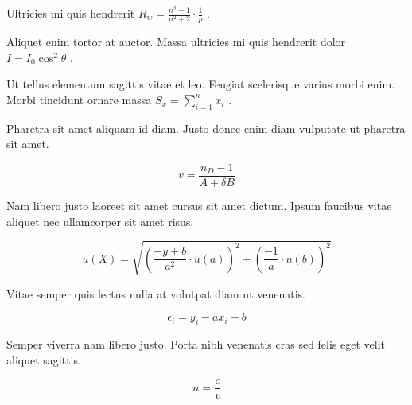 \documentclass{article}
\begin{document}
Ultricies mi quis hendrerit 
\begin{math}
	R_w=\frac{n^2-1}{n^2+2} \cdot \frac{1}{p}
\end{math}
.\newline

Aliquet enim tortor at auctor. Massa ultricies mi quis hendrerit dolor 
$ I=I_0\cos ^2\theta $
.\newline

Ut tellus elementum sagittis vitae et leo. Feugiat scelerisque varius morbi enim. Morbi tincidunt ornare massa
 \( S_x=\sum_{i=1}^{n}x_i \)
 .\newline

Pharetra sit amet aliquam id diam. Justo donec enim diam vulputate ut pharetra sit amet.

\[ v=\frac{n_D-1}{A+\delta B} \]

Nam libero justo laoreet sit amet cursus sit amet dictum. Ipsum faucibus vitae aliquet nec ullamcorper sit amet risus.

$$ u(X)=\sqrt{(\frac{-y+b}{a^2}\cdot u(a))^2+(\frac{-1}{a}\cdot u(b))^2} $$

Vitae semper quis lectus nulla at volutpat diam ut venenatis.

\begin{displaymath}
	\epsilon_i=y_i-ax_i-b
\end{displaymath}

Semper viverra nam libero justo. Porta nibh venenatis cras sed felis eget velit aliquet sagittis.

\begin{equation}
	n=\frac{c}{v}
\end{equation}
\end{document}
